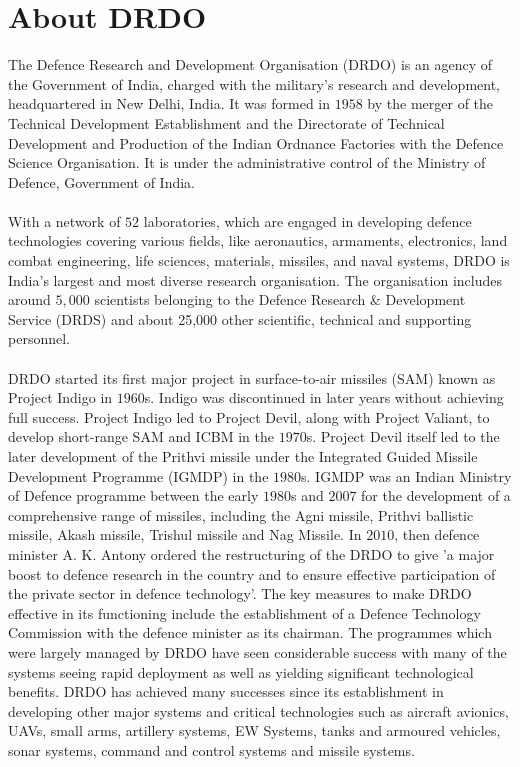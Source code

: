 \documentclass[12pt]{report}
\begin{document}
\section{About DRDO}
The Defence Research and Development Organisation (DRDO) is an agency of the Government of India, charged with the military's research and development, headquartered in New Delhi, India. It was formed in $1958$ by the merger of the Technical Development Establishment and the Directorate of Technical Development and Production of the Indian Ordnance Factories with the Defence Science Organisation. It is under the administrative control of the Ministry of Defence, Government of India.\\
\\
With a network of $52$ laboratories, which are engaged in developing defence technologies covering various fields, like aeronautics, armaments, electronics, land combat engineering, life sciences, materials, missiles, and naval systems, DRDO is India's largest and most diverse research organisation. The organisation includes around $5,000$ scientists belonging to the Defence Research \& Development Service (DRDS) and about 25,000 other scientific, technical and supporting personnel.  \\ 
\\
DRDO started its first major project in surface-to-air missiles (SAM) known as Project Indigo in $1960$s. Indigo was discontinued in later years without achieving full success. Project Indigo led to Project Devil, along with Project Valiant, to develop short-range SAM and ICBM in the $1970$s. Project Devil itself led to the later development of the Prithvi missile under the Integrated Guided Missile Development Programme (IGMDP) in the $1980$s. IGMDP was an Indian Ministry of Defence programme between the early $1980$s and $2007$ for the development of a comprehensive range of missiles, including the Agni missile, Prithvi ballistic missile, Akash missile, Trishul missile and Nag Missile. In $2010$, then defence minister A. K. Antony ordered the restructuring of the DRDO to give 'a major boost to defence research in the country and to ensure effective participation of the private sector in defence technology'. The key measures to make DRDO effective in its functioning include the establishment of a Defence Technology Commission with the defence minister as its chairman. The programmes which were largely managed by DRDO have seen considerable success with many of the systems seeing rapid deployment as well as yielding significant technological benefits. DRDO has achieved many successes since its establishment in developing other major systems and critical technologies such as aircraft avionics, UAVs, small arms, artillery systems, EW Systems, tanks and armoured vehicles, sonar systems, command and control systems and missile systems.\\  \\
\end{document}
